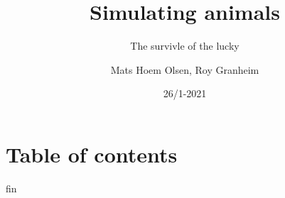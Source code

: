 \documentclass[12pt]{beamer}
\begin{document}
\author{Mats Hoem Olsen, Roy Granheim}
\title{Simulating animals}
\subtitle{The survivle of the lucky}
\date{26/1-2021}
\subject{INF200}

\begin{frame}
\maketitle
\end{frame}

\section{Table of contents}
\begin{frame}
\tableofcontents
\end{frame}

\setcounter{section}{0}





\begin{frame}{fin}
	\transduration<0-19>{0}
\end{frame}
\end{document}
